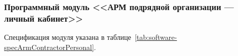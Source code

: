 
\subsubsection{Программный модуль <<АРМ подрядной организации --- личный кабинет>>}

Спецификация модуля указана в таблице~\ref{tab:software-specArmContractorPersonal}.

